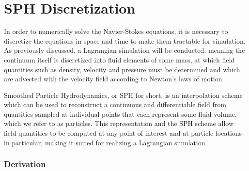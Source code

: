 \documentclass[oneside, a4paper]{book}
\newcommand\vek[1]{\vec{\bm{#1}}}
\begin{document}

    \newpage\section{SPH Discretization}\label{sec:sph-discretization}
    In order to numerically solve the Navier-Stokes equations, it is necessary to discretize the equations in space and time to make them tractable for simulation. As previously discussed, a Lagrangian simulation will be conducted, meaning the continuum itself is discretized into fluid elements of some mass, at which field quantities such as density, velocity and pressure must be determined and which are advected with the velocity field according to Newton's laws of motion. 
    
    Smoothed Particle Hydrodynamics, or SPH for short, is an interpolation scheme which can be used to reconstruct a continuous and differentiable field from quantities sampled at individual points that each represent some fluid volume, which we refer to as particles. This representation and the SPH scheme allow field quantities to be computed at any point of interest and at particle locations in particular, making it suited for realizing a Lagrangian simulation.

    \subsubsection{Derivation}
\end{document}
